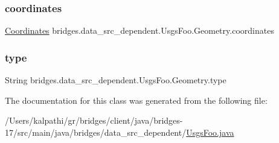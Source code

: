 \subsubsection{\texorpdfstring{coordinates}{coordinates}}
{\footnotesize\ttfamily \mbox{\hyperlink{classbridges_1_1data__src__dependent_1_1_usgs_foo_1_1_geometry_1_1_coordinates}{Coordinates}} bridges.\+data\+\_\+src\+\_\+dependent.\+Usgs\+Foo.\+Geometry.\+coordinates}

\mbox{\label{classbridges_1_1data__src__dependent_1_1_usgs_foo_1_1_geometry_a985b3a46dad2fcd4e798d2f51198bcfd}} 
\subsubsection{\texorpdfstring{type}{type}}
{\footnotesize\ttfamily String bridges.\+data\+\_\+src\+\_\+dependent.\+Usgs\+Foo.\+Geometry.\+type}



The documentation for this class was generated from the following file\+:\begin{DoxyCompactItemize}
\item 
/\+Users/kalpathi/gr/bridges/client/java/bridges-\/17/src/main/java/bridges/data\+\_\+src\+\_\+dependent/\mbox{\hyperlink{_usgs_foo_8java}{Usgs\+Foo.\+java}}\end{DoxyCompactItemize}

